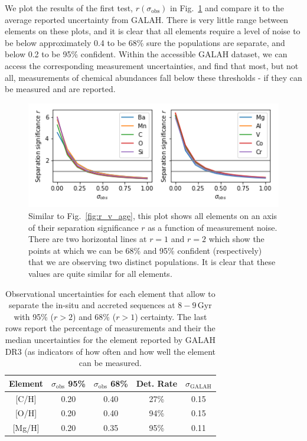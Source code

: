 \documentclass[fleqn,usenatbib]{mnras}
\begin{document}
We plot the results of the first test, $r (\sigma_\text{obs})$ in Fig.~\ref{fig:r_v_obs} and compare it to the average reported uncertainty from GALAH. There is very little range between elements on these plots, and it is clear that all elements require a level of noise to be below approximately 0.4 to be 68\% sure the populations are separate, and below 0.2 to be 95\% confident. Within the accessible GALAH dataset, we can access the corresponding measurement uncertainties, and find that most, but not all, measurements of chemical abundances fall below these thresholds - if they can be measured and are reported.

\begin{figure}
	\includegraphics[width=\columnwidth]{figures/same_axis_r_sigma.png}
    \caption{Similar to Fig.~\ref{fig:r_v_age}, this plot shows all elements on an axis of their separation significance $r$ as a function of measurement noise. There are two horizontal lines at $r=1$ and $r=2$ which show the points at which we can be 68\% and 95\% confident (respectively) that we are observing two distinct populations. It is clear that these values are quite similar for all elements.}
    \label{fig:r_v_obs}
\end{figure}

\begin{center}
\begin{table}
    \centering
    \caption{Observational uncertainties for each element that allow to separate the in-situ and accreted sequences at $8-9\,\mathrm{Gyr}$ with 95\% ($r>2$) and 68\% ($r>1$) certainty. The last rows report the percentage of measurements and their the median uncertainties for the element reported by GALAH DR3 (as indicators of how often and how well the element can be measured.}
    \begin{tabular}{ccccc} 
     \hline
     Element & $\sigma_\text{obs}$ 95\% & $\sigma_\text{obs}$ 68\% & Det. Rate & $\sigma_\text{GALAH}$ \\ 
     \hline\hline
     {[C/H]}  & 0.20 & 0.40 & 27\% & 0.15 \\
     {[O/H]}  & 0.20 & 0.40 & 94\% & 0.15 \\
     {[Mg/H]} & 0.20 & 0.35 & 95\% & 0.11 \\
     \hline
    \end{tabular}
    \label{tab:sigma_obs}
\end{table}
\end{center}
\end{document}
